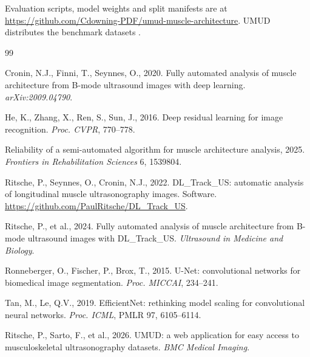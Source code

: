 \documentclass[12pt]{article}
\begin{document}
Evaluation scripts, model weights and split manifests are at
\url{https://github.com/Cdowning-PDF/umud-muscle-architecture}. UMUD distributes
the benchmark datasets \citep{umud2024}.

\begin{thebibliography}{99}
\small

Cronin, N.J., Finni, T., Seynnes, O., 2020. Fully automated analysis of muscle
architecture from B-mode ultrasound images with deep learning.
\emph{arXiv:2009.04790}.

He, K., Zhang, X., Ren, S., Sun, J., 2016. Deep residual learning for image
recognition. \emph{Proc. CVPR}, 770--778.

Reliability of a semi-automated algorithm for muscle architecture analysis,
2025. \emph{Frontiers in Rehabilitation Sciences} 6, 1539804.

Ritsche, P., Seynnes, O., Cronin, N.J., 2022. DL\_Track\_US: automatic analysis
of longitudinal muscle ultrasonography images. Software.
\url{https://github.com/PaulRitsche/DL\_Track\_US}.

Ritsche, P., et al., 2024. Fully automated analysis of muscle architecture from
B-mode ultrasound images with DL\_Track\_US. \emph{Ultrasound in Medicine and
Biology}.

Ronneberger, O., Fischer, P., Brox, T., 2015. U-Net: convolutional networks for
biomedical image segmentation. \emph{Proc. MICCAI}, 234--241.

Tan, M., Le, Q.V., 2019. EfficientNet: rethinking model scaling for
convolutional neural networks. \emph{Proc. ICML}, PMLR 97, 6105--6114.

Ritsche, P., Sarto, F., et al., 2026. UMUD: a web application for easy access to
musculoskeletal ultrasonography datasets. \emph{BMC Medical Imaging}.

\end{thebibliography}
\end{document}

